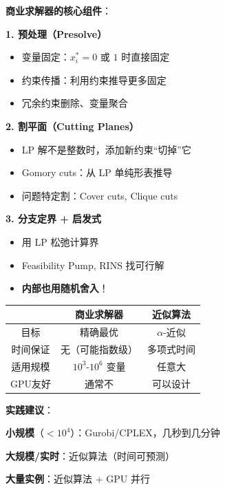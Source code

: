 \documentclass[12pt, a4paper]{ctexart}
\begin{document}
\begin{blackboard}

\textbf{商业求解器的核心组件}：

\textbf{1. 预处理（Presolve）}
\begin{itemize}
    \item 变量固定：$x_i^* = 0$ 或 $1$ 时直接固定
    \item 约束传播：利用约束推导更多固定
    \item 冗余约束删除、变量聚合
\end{itemize}

\textbf{2. 割平面（Cutting Planes）}
\begin{itemize}
    \item LP 解不是整数时，添加新约束``切掉''它
    \item Gomory cuts：从 LP 单纯形表推导
    \item 问题特定割：Cover cuts, Clique cuts
\end{itemize}

\textbf{3. 分支定界 + 启发式}
\begin{itemize}
    \item 用 LP 松弛计算界
    \item Feasibility Pump, RINS 找可行解
    \item \textbf{内部也用随机舍入}！
\end{itemize}

\end{blackboard}

\begin{blackboard}

\begin{center}
\begin{tabular}{c|c|c}
& \textbf{商业求解器} & \textbf{近似算法} \\
\hline
目标 & 精确最优 & $\alpha$-近似 \\
时间保证 & 无（可能指数级） & 多项式时间 \\
适用规模 & $10^3$-$10^6$ 变量 & 任意大 \\
GPU友好 & 通常不 & 可以设计
\end{tabular}
\end{center}

\textbf{实践建议}：

\textbf{小规模}（$< 10^4$）：Gurobi/CPLEX，几秒到几分钟

\textbf{大规模/实时}：近似算法（时间可预测）

\textbf{大量实例}：近似算法 + GPU 并行

\end{blackboard}
\end{document}
